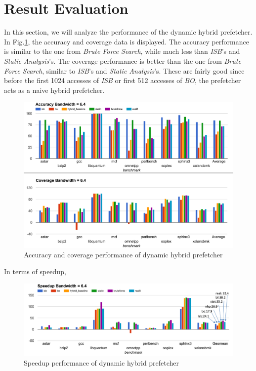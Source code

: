 \section{Result Evaluation}
\label{sec:result}
In this section, we will analyze the performance of the dynamic hybrid prefetcher. In Fig.\ref{fig:final_acc_cov}, the accuracy and coverage data is displayed. The accuracy performance is similar to the one from \emph{Brute Force Search}, while much less than \emph{ISB}'s and \emph{Static Analysis}'s. The coverage performance is better than the one from \emph{Brute Force Search}, similar to \emph{ISB}'s and \emph{Static Analysis}'s. These are fairly good since before the first 1024 accesses of \emph{ISB} or first 512 accesses of \emph{BO}, the prefetcher acts as a naive hybrid prefetcher.

\begin{figure}[ht!]
   \centering
   \includegraphics[width=1.0\textwidth]{images/final_acc_cov.png}
   \caption{Accuracy and coverage performance of dynamic hybrid prefetcher}
   \label{fig:final_acc_cov}
\end{figure}

In terms of speedup,

\begin{figure}[ht!]
   \centering
   \includegraphics[width=1.0\textwidth]{images/final_speedup.png}
   \caption{Speedup performance of dynamic hybrid prefetcher}
   \label{fig:final_speedup}
\end{figure}

